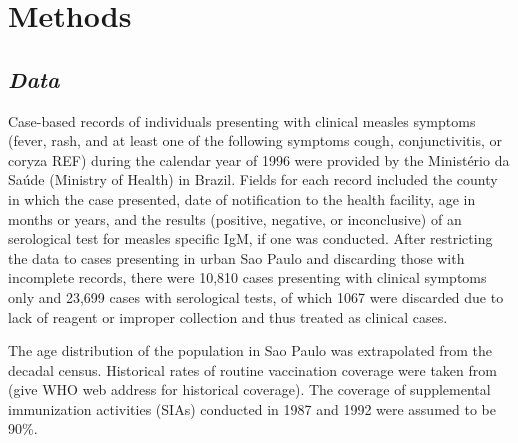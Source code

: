\section{\texorpdfstring{\textbf{Methods}}{Methods}}\label{methods}

\subsection{\texorpdfstring{\emph{Data}}{Data}}\label{data}

Case-based records of individuals presenting with clinical measles
symptoms (fever, rash, and at least one of the following symptoms cough,
conjunctivitis, or coryza REF) during the calendar year of 1996 were
provided by the Ministério da Saúde (Ministry of Health) in Brazil. Fields for each
record included the county in which the case presented, date of
notification to the health facility, age in months or years, and the
results (positive, negative, or inconclusive) of an serological test for
measles specific IgM, if one was conducted. After restricting the data to cases
presenting in urban Sao Paulo and discarding those with incomplete
records, there were 10,810 cases presenting with clinical symptoms only
and 23,699 cases with serological tests, of which 1067 were discarded
due to lack of reagent or improper collection and thus treated as
clinical cases.

The age distribution of the population in Sao Paulo was extrapolated
from the decadal census. Historical rates of routine vaccination
coverage were taken from (give WHO web address for historical coverage).
The coverage of supplemental immunization activities (SIAs) conducted in
1987 and 1992 were assumed to be 90\%.